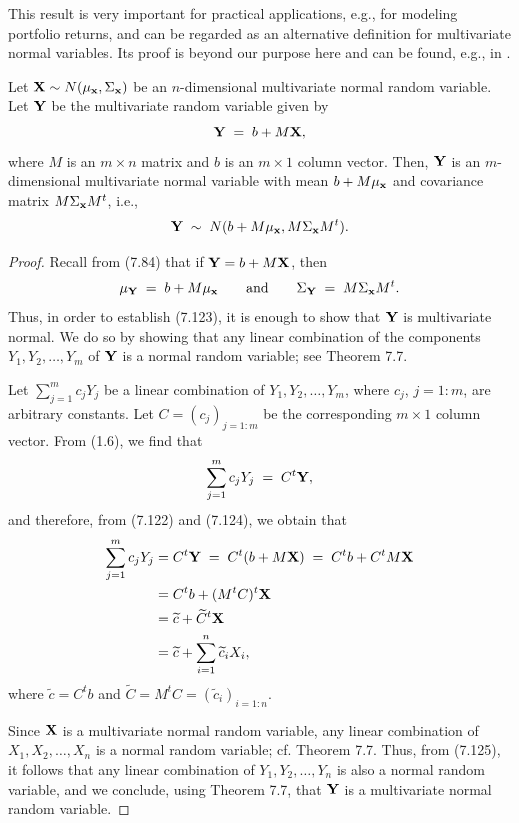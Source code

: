 This result is very important for practical applications, e.g., for modeling portfolio returns,
and can be regarded as an alternative definition for multivariate normal variables. Its proof is
beyond our purpose here and can be found, e.g., in \cite{24}.

\begin{theorem}
Let $\mathbf{X} \sim N(\mu_{\mathbf{x}},\Sigma_{\mathbf{x}})$ be an $n$-dimensional multivariate normal random
variable. Let $\mathbf{Y}$ be the multivariate random variable given by
\begin{equation}
\mathbf{Y} \;=\; b + M\mathbf{X},
\end{equation}
where $M$ is an $m \times n$ matrix and $b$ is an $m \times 1$ column vector. Then, $\mathbf{Y}$ is an
$m$-dimensional multivariate normal variable with mean $b + M\mu_{\mathbf{x}}$ and covariance matrix
$M\Sigma_{\mathbf{x}}M^t$, i.e.,
\begin{equation}
\mathbf{Y} \;\sim\; N(b+M\mu_{\mathbf{x}}, M\Sigma_{\mathbf{x}}M^t).
\end{equation}
\end{theorem}

\begin{proof}
Recall from (7.84) that if $\mathbf{Y} = b+M\mathbf{X}$, then
\[
\mu_{\mathbf{Y}} \;=\; b + M\mu_{\mathbf{x}} \qquad \text{and} \qquad \Sigma_{\mathbf{Y}} \;=\; M\Sigma_{\mathbf{x}}M^t.
\]
Thus, in order to establish (7.123), it is enough to show that $\mathbf{Y}$ is multivariate normal.
We do so by showing that any linear combination of the components $Y_1, Y_2, \ldots, Y_m$ of
$\mathbf{Y}$ is a normal random variable; see Theorem 7.7.

Let $\sum_{j=1}^m c_jY_j$ be a linear combination of $Y_1, Y_2, \ldots, Y_m$, where $c_j$, $j =
1:m$, are arbitrary constants. Let $C = (c_j)_{j=1:m}$ be the corresponding $m \times 1$ column
vector. From (1.6), we find that
\begin{equation}
\sum_{j=1}^m c_jY_j \;=\; C^t\mathbf{Y},
\end{equation}
and therefore, from (7.122) and (7.124), we obtain that
\begin{align}
\sum_{j=1}^m c_jY_j &= C^t\mathbf{Y} \;=\; C^t(b+M\mathbf{X}) \;=\; C^tb+C^tM\mathbf{X} \notag \\
&= C^tb+(M^tC)^t\mathbf{X} \notag \\
&= \widetilde{c}+\widetilde{C}^t\mathbf{X} \notag \\
&= \widetilde{c}+\sum_{i=1}^n \widetilde{c}_iX_i,
\end{align}
where $\widetilde{c} = C^tb$ and $\widetilde{C} = M^tC = (\widetilde{c}_i)_{i=1:n}$.

Since $\mathbf{X}$ is a multivariate normal random variable, any linear combination of $X_1, X_2,
\ldots, X_n$ is a normal random variable; cf. Theorem 7.7. Thus, from (7.125), it follows that
any linear combination of $Y_1, Y_2, \ldots, Y_n$ is also a normal random variable, and we
conclude, using Theorem 7.7, that $\mathbf{Y}$ is a multivariate normal random variable.
\end{proof}

